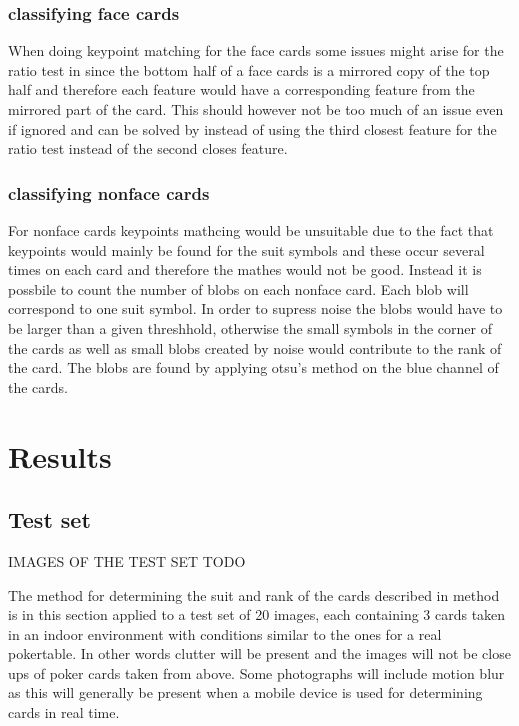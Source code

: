 \documentclass[journal,twoside]{IEEEtran}
\begin{document}
\subsubsection{classifying face cards}

When doing keypoint matching for the face cards some issues might arise for the ratio test in \cite{SIFT} since the bottom half of a face cards is a mirrored copy of the top half and therefore each feature would have a corresponding feature from the mirrored part of the card. This should however not be too much of an issue even if ignored and can be solved by instead of using the third closest feature for the ratio test instead of the second  closes feature. 

\subsubsection{classifying nonface cards}

For nonface cards keypoints mathcing would be unsuitable due to the fact that keypoints would mainly be found for the suit symbols and these occur several times on each card and therefore the mathes would not be good.
Instead it is possbile to count the number of blobs on each nonface card. Each blob will correspond to one suit symbol. In order to supress noise the blobs would have to be larger than a given threshhold, otherwise the small symbols in the corner of the cards as well as small blobs created by noise would contribute to the rank of the card. The blobs are found by applying otsu's method on the blue channel of the cards.

\section{Results}

\subsection{Test set}

IMAGES OF THE TEST SET TODO

The method for determining the suit and rank of the cards described in method is in this section applied to a test set of 20 images, each containing 3 cards taken in an indoor environment with conditions similar to the ones for a real pokertable. In other words clutter will be present and the images will not be close ups of poker cards taken from above. Some photographs will include motion blur as this will generally be present when a mobile device is used for determining cards in real time.
\end{document}
